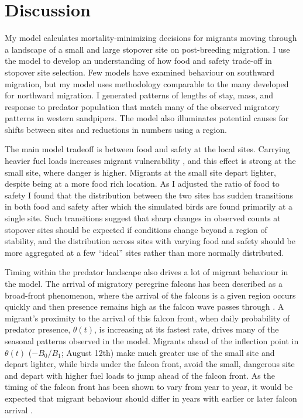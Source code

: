 \section{Discussion}

My model calculates mortality-minimizing decisions for migrants moving through a landscape of a small and large stopover site on post-breeding migration. I use the model to develop an understanding of how food and safety trade-off in stopover site selection. Few models have examined behaviour on southward migration, but my model uses methodology comparable to the many developed for northward migration. I generated patterns of lengths of stay, mass, and response to predator population that match many of the observed migratory patterns in western sandpipers. The model also illuminates potential causes for shifts between sites and reductions in numbers using a region.

The main model tradeoff is between food and safety at the local sites. Carrying heavier fuel loads increases migrant vulnerability \citep{burns_effects_2002}, and this effect is strong at the small site, where danger is higher. Migrants at the small site depart lighter, despite being at a more food rich location. As I adjusted the ratio of food to safety I found that the distribution between the two sites has sudden transitions in both food and safety after which the simulated birds are found primarily at a single site. Such transitions suggest that sharp changes in observed counts at stopover sites should be expected if conditions change beyond a region of stability, and the distribution across sites with varying food and safety should be more aggregated at a few ``ideal'' sites rather than more normally distributed.

Timing within the predator landscape also drives a lot of migrant behaviour in the model. The arrival of migratory peregrine falcons has been described as a broad-front phenomenon, where the arrival of the falcons is a given region occurs quickly and then presence remains high as the falcon wave passes through \citep{Ydenberg2007b,Worcester2008,lank_effects_2003,Hope2011,Hope2014}. A migrant's proximity to the arrival of this falcon front, when daily probability of predator presence, $\theta(t)$, is increasing at its fastest rate, drives many of the seasonal patterns observed in the model. Migrants ahead of the inflection point in $\theta(t)$ ($-B_0/B_1$; August 12th) make much greater use of the small site and depart lighter, while birds under the falcon front, avoid the small, dangerous site and depart with higher fuel loads to jump ahead of the falcon front. As the timing of the falcon front has been shown to vary from year to year, it would be expected that migrant behaviour should differ in years with earlier or later falcon arrival \citep{Niehaus2006}.

